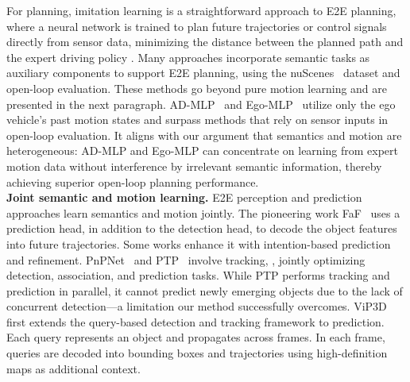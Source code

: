 For planning, imitation learning is a straightforward approach to \gls{E2E} planning, where a neural network is trained to plan future trajectories or control signals directly from sensor data, minimizing the distance between the planned path and the expert driving policy \cite{bojarski2016end, prakash2021multi, chen2022learning}. Many approaches incorporate semantic tasks as auxiliary components to support \gls{E2E} planning, using the nuScenes~\cite{caesar2020nuscenes} dataset and open-loop evaluation. These methods go beyond pure motion learning and are presented in the next paragraph. 
AD-MLP~\cite{zhai2023rethinking} and Ego-MLP~\cite{li2024ego} utilize only the ego vehicle's past motion states and surpass methods that rely on sensor inputs in open-loop evaluation. It aligns with our argument that semantics and motion are heterogeneous: AD-MLP and Ego-MLP can concentrate on learning from expert motion data without interference by irrelevant semantic information, thereby achieving superior open-loop planning performance.\\

\textbf{Joint semantic and motion learning.}
\Gls{E2E} perception and prediction approaches learn semantics and motion jointly. The pioneering work FaF~\cite{luo2018fast} uses a prediction head, in addition to the detection head, to decode the object features into future trajectories. Some works \cite{casas2018intentnet, djuric2021multixnet, fadadu2022multi} enhance it with intention-based prediction and refinement. PnPNet~\cite{liang2020pnpnet} and PTP~\cite{weng2021ptp} involve tracking, \ie, jointly optimizing detection, association, and prediction tasks. While PTP performs tracking and prediction in parallel, it cannot predict newly emerging objects due to the lack of concurrent detection—a limitation our method successfully overcomes. ViP3D~\cite{gu2023vip3d} first extends the query-based detection and tracking framework \cite{zeng2022motr} to prediction. Each query represents an object and propagates across frames. In each frame, queries are decoded into bounding boxes and trajectories using high-definition maps as additional context. 

